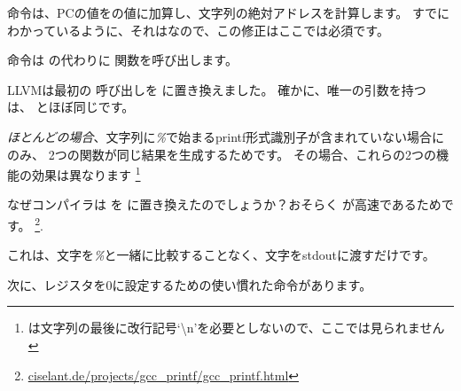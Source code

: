 命令は、\ac{PC}の値をの値に加算し、文字列の絶対アドレスを計算します。 
すでにわかっているように、それはなので、この修正はここでは必須です。

命令は \printf の代わりに \puts 関数を呼び出します。

\label{puts}

LLVMは最初の \printf 呼び出しを \puts に置き換えました。 
確かに、唯一の引数を持つ \printf は、 \puts とほぼ同じです。

\emph{ほとんどの場合}、文字列に\emph{\%}で始まるprintf形式識別子が含まれていない場合にのみ、
2つの関数が同じ結果を生成するためです。 その場合、これらの2つの機能の効果は異なります
\footnote{ \puts は文字列の最後に改行記号`\textbackslash{}n'を必要としないので、ここでは見られません}

なぜコンパイラは \printf を \puts に置き換えたのでしょうか？おそらく \puts が高速であるためです。
\footnote{\href{http://go.yurichev.com/17063}{ciselant.de/projects/gcc\_printf/gcc\_printf.html}}. 

これは、文字を\emph{\%}と一緒に比較することなく、文字を\gls{stdout}に渡すだけです。

次に、レジスタを0に設定するための使い慣れた命令があります。
